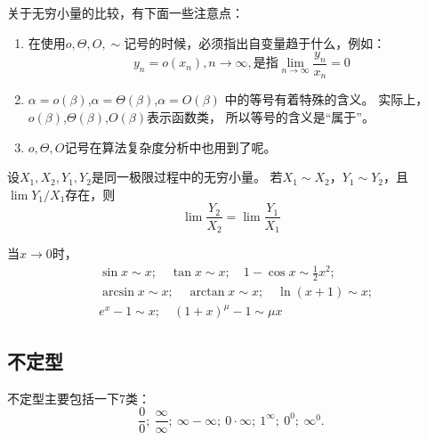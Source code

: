 \begin{remark}
  关于无穷小量的比较，有下面一些注意点：
  \begin{enumerate}
    \item
    在使用$o,\Theta,O,\sim$记号的时候，必须指出自变量趋于什么，例如：
    \begin{displaymath}
      y_n=o(x_n), n\to\infty,\text{是指}\lim_{n\to\infty}\frac{y_n}{x_n}=0
    \end{displaymath}
    \item
    $\alpha=o(\beta)$,$\alpha=\Theta(\beta)$,$\alpha=O(\beta)$
    中的等号有着特殊的含义。
    实际上，$o(\beta)$,$\Theta(\beta)$,$O(\beta)$表示函数类，
    所以等号的含义是``属于''。
    \item
    $o,\Theta,O$记号在算法复杂度分析中也用到了呢。
  \end{enumerate}
\end{remark}

\begin{theorem}[替换定理]
  设$X_1,X_2,Y_1,Y_2$是同一极限过程中的无穷小量。
  若$X_1\sim X_2$，$Y_1\sim Y_2$，且$\lim Y_1/X_1$存在，则
  \begin{displaymath}
    \lim \frac{Y_2}{X_2}=\lim \frac{Y_1}{X_1}
  \end{displaymath}
\end{theorem}

\begin{theorem}[常用的等价无穷小]
  当$x\to 0$时，
  \begin{align*}
    & \sin x \sim x;\quad \tan x \sim x;\quad 1-\cos x \sim \frac{1}{2}x^2;  \\
    & \arcsin x \sim x;\quad \arctan x \sim x;\quad \ln(x+1)\sim x; \\
    & e^x-1\sim x;\quad (1+x)^\mu - 1 \sim \mu x
  \end{align*}
\end{theorem}

\subsection{不定型}
不定型主要包括一下7类：
\begin{displaymath}
  \frac{0}{0};\ \frac{\infty}{\infty};\ \infty-\infty;\ 0\cdot\infty;
  \ 1^\infty;\ 0^0;\ \infty^0.
\end{displaymath}